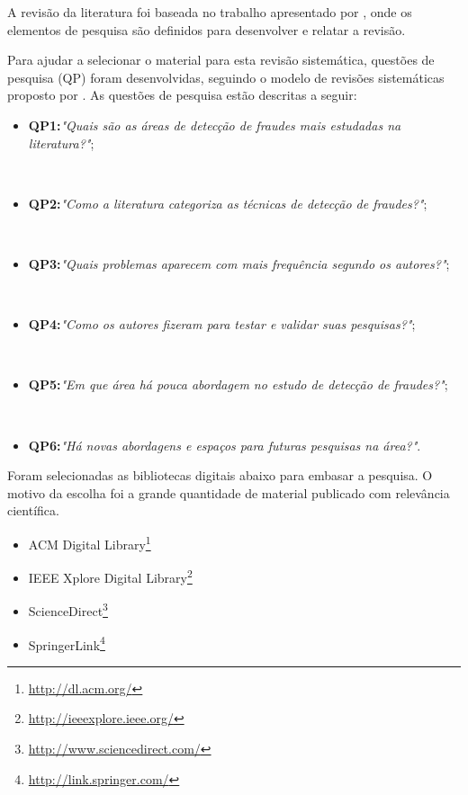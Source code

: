\documentclass[smallextended]{svjour3}
\begin{document}
A revisão da literatura foi baseada no trabalho apresentado por \cite{Kitchenham07guidelinesfor}, onde os elementos de pesquisa são definidos para desenvolver e relatar a revisão.

Para ajudar a selecionar o material para esta revisão sistemática, questões de pesquisa (QP) foram desenvolvidas, seguindo o modelo de revisões sistemáticas proposto por \cite{Kitchenham07guidelinesfor}. As questões de pesquisa estão descritas a seguir:

\begin{itemize}
	\item \textbf{QP1:}\textit{"Quais são as áreas de detecção de fraudes mais estudadas na literatura?"};
	 
	\
	\item \textbf{QP2:}\textit{"Como a literatura categoriza as técnicas de detecção de fraudes?"};
	
	\
	\item \textbf{QP3:}\textit{"Quais problemas aparecem com mais frequência segundo os autores?"};
	
	\
	\item \textbf{QP4:}\textit{"Como os autores fizeram para testar e validar suas pesquisas?"};
	
	\
	\item \textbf{QP5:}\textit{"Em que área há pouca abordagem no estudo de detecção de fraudes?"};
	
	\
	\item \textbf{QP6:}\textit{"Há novas abordagens e espaços para futuras pesquisas na área?"}.
\end{itemize}

Foram selecionadas as bibliotecas digitais abaixo para embasar a pesquisa. O motivo da escolha foi a grande quantidade de material publicado com relevância científica.

\begin{itemize}
	\item \textsf{ACM Digital Library}\footnote{\url{http://dl.acm.org/}}
	
	\item \textsf{IEEE Xplore Digital Library}\index{IEEE Xplore Digital Library}\footnote{\url{http://ieeexplore.ieee.org/}}
	
	\item \textsf{ScienceDirect}\footnote{\url{http://www.sciencedirect.com/}} 	
	
	\item \textsf{SpringerLink}\footnote{\url{http://link.springer.com/}}
\end{itemize}
\end{document}
